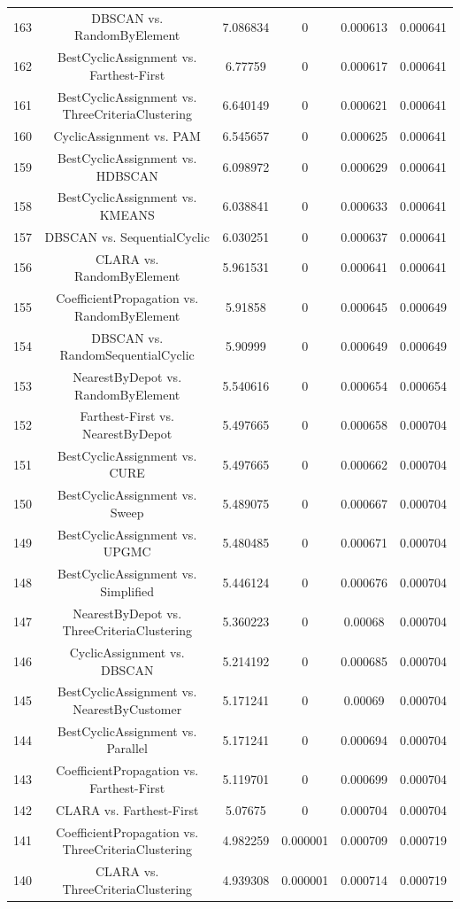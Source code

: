 \documentclass[a4paper,10pt]{article}
\begin{document}
\begin{landscape}
\begin{table}[!htp]
\begin{tabular}{cccccc}
163&DBSCAN vs. RandomByElement&7.086834&0&0.000613&0.000641\\
162&BestCyclicAssignment vs. Farthest-First&6.77759&0&0.000617&0.000641\\
161&BestCyclicAssignment vs. ThreeCriteriaClustering&6.640149&0&0.000621&0.000641\\
160&CyclicAssignment vs. PAM&6.545657&0&0.000625&0.000641\\
159&BestCyclicAssignment vs. HDBSCAN&6.098972&0&0.000629&0.000641\\
158&BestCyclicAssignment vs. KMEANS&6.038841&0&0.000633&0.000641\\
157&DBSCAN vs. SequentialCyclic&6.030251&0&0.000637&0.000641\\
156&CLARA vs. RandomByElement&5.961531&0&0.000641&0.000641\\
155&CoefficientPropagation vs. RandomByElement&5.91858&0&0.000645&0.000649\\
154&DBSCAN vs. RandomSequentialCyclic&5.90999&0&0.000649&0.000649\\
153&NearestByDepot vs. RandomByElement&5.540616&0&0.000654&0.000654\\
152&Farthest-First vs. NearestByDepot&5.497665&0&0.000658&0.000704\\
151&BestCyclicAssignment vs. CURE&5.497665&0&0.000662&0.000704\\
150&BestCyclicAssignment vs. Sweep&5.489075&0&0.000667&0.000704\\
149&BestCyclicAssignment vs. UPGMC&5.480485&0&0.000671&0.000704\\
148&BestCyclicAssignment vs. Simplified&5.446124&0&0.000676&0.000704\\
147&NearestByDepot vs. ThreeCriteriaClustering&5.360223&0&0.00068&0.000704\\
146&CyclicAssignment vs. DBSCAN&5.214192&0&0.000685&0.000704\\
145&BestCyclicAssignment vs. NearestByCustomer&5.171241&0&0.00069&0.000704\\
144&BestCyclicAssignment vs. Parallel&5.171241&0&0.000694&0.000704\\
143&CoefficientPropagation vs. Farthest-First&5.119701&0&0.000699&0.000704\\
142&CLARA vs. Farthest-First&5.07675&0&0.000704&0.000704\\
141&CoefficientPropagation vs. ThreeCriteriaClustering&4.982259&0.000001&0.000709&0.000719\\
140&CLARA vs. ThreeCriteriaClustering&4.939308&0.000001&0.000714&0.000719\\

\end{tabular}
\end{table}
\end{landscape}
\end{document}
